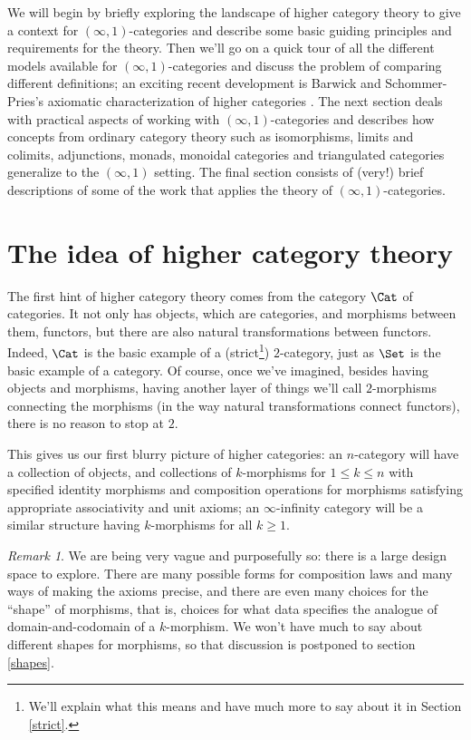 \documentclass{conm-p-l}
\theoremstyle{definition} \newtheorem{definition}[theorem]{Definition}
\theoremstyle{remark} \newtheorem{remark}[theorem]{Remark}
\numberwithin{equation}{section}
\newcommand{\oo}{\infty}
\newcommand{\io}{$(\oo,1)$}
\begin{document}
We will begin by briefly exploring the landscape of higher category
theory to give a context for \io-categories and describe some basic
guiding principles and requirements for the theory. Then we'll go on a
quick tour of all the different models available for \io-categories
and discuss the problem of comparing different definitions; an
exciting recent development is Barwick and Schommer-Pries's axiomatic
characterization of higher categories \cite{ClarkChris}. The next
section deals with practical aspects of working with \io-categories
and describes how concepts from ordinary category theory such as
isomorphisms, limits and colimits, adjunctions, monads, monoidal
categories and triangulated categories generalize to the \io{}
setting. The final section consists of (very!) brief descriptions
of some of the work that applies the theory of \io-categories.

\section{The idea of higher category theory}

The first hint of higher category theory comes from the category
$\Cat$ of categories. It not only has objects, which are categories,
and morphisms between them, functors, but there are also natural
transformations between functors. Indeed, $\Cat$ is the basic example
of a (strict\footnote{We'll explain what this means and have much more
to say about it in Section \ref{strict}.}) $2$-category, just as
$\Set$ is the basic example of a category. Of course, once we've
imagined, besides having objects and morphisms, having another layer
of things we'll call $2$-morphisms connecting the morphisms (in the
way natural transformations connect functors), there is no reason to
stop at $2$.

This gives us our first blurry picture of higher categories: an
$n$-category will have a collection of objects, and collections of
$k$-morphisms for $1 \le k \le n$ with specified identity morphisms
and composition operations for morphisms satisfying appropriate
associativity and unit axioms; an $\oo$-infinity category will be a
similar structure having $k$-morphisms for all $k \ge 1$.

\begin{remark} We are being very vague and purposefully so: there is a
large design space to explore. There are many possible forms for
composition laws and many ways of making the axioms precise, and there
are even many choices for the ``shape'' of morphisms, that is, choices
for what data specifies the analogue of domain-and-codomain of a
$k$-morphism. We won't have much to say about different shapes for
morphisms, so that discussion is postponed to section \ref{shapes}.
\end{remark}
\end{document}

